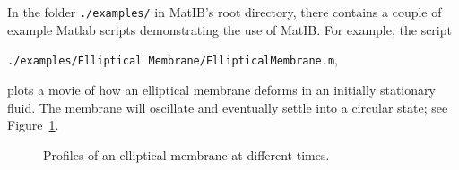 \documentclass{article}
\newcommand{\mycode}[1]{\texttt{#1}}
\begin{document}
In the folder \mycode{./examples/} in MatIB's root directory, there contains a couple of example Matlab scripts demonstrating the use of MatIB.
For example, the script 
\begin{center}
\mycode{./examples/Elliptical Membrane/EllipticalMembrane.m}, 
\end{center}
plots a movie of how an elliptical membrane deforms in an initially 
stationary fluid. The membrane will oscillate and eventually settle into a circular state; see Figure~\ref{fig:ellipseProfile}.

\begin{figure}[htdp]
	\centering
  	\caption{Profiles of an elliptical membrane at different times. }
  	\label{fig:ellipseProfile}
\end{figure}
\end{document}
